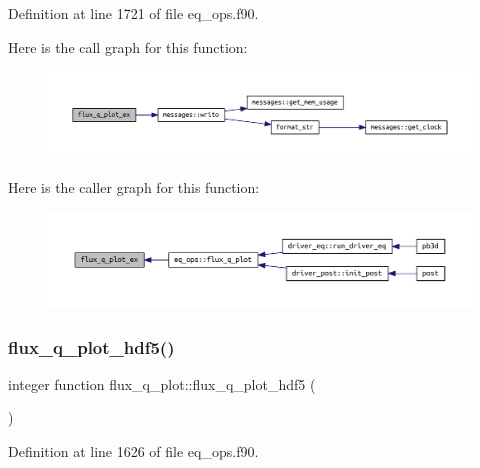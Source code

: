 Definition at line 1721 of file eq\+\_\+ops.\+f90.

Here is the call graph for this function\+:
\nopagebreak
\begin{figure}[H]
\begin{center}
\leavevmode
\includegraphics[width=350pt]{eq__ops_8f90_aef1c3c58c42be2651bc2153d0a1ae5a9_cgraph}
\end{center}
\end{figure}
Here is the caller graph for this function\+:
\nopagebreak
\begin{figure}[H]
\begin{center}
\leavevmode
\includegraphics[width=350pt]{eq__ops_8f90_aef1c3c58c42be2651bc2153d0a1ae5a9_icgraph}
\end{center}
\end{figure}
\mbox{\label{eq__ops_8f90_aed8d3363343555190699b29e393b4e23}} 
\subsubsection{\texorpdfstring{flux\+\_\+q\+\_\+plot\+\_\+hdf5()}{flux\_q\_plot\_hdf5()}}
{\footnotesize\ttfamily integer function flux\+\_\+q\+\_\+plot\+::flux\+\_\+q\+\_\+plot\+\_\+hdf5 (\begin{DoxyParamCaption}{ }\end{DoxyParamCaption})}



Definition at line 1626 of file eq\+\_\+ops.\+f90.

